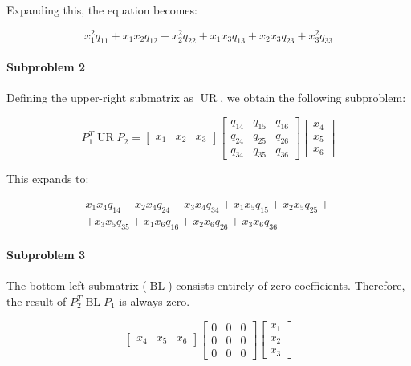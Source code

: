 Expanding this, the equation becomes:

\begin{equation}
 x_1^2q_{11} + x_1x_2q_{12} + x_2^2q_{22} + x_1x_3q_{13} + x_2x_3q_{23} + x_3^2q_{33}
    \label{eq:UL}
\end{equation}

\paragraph{Subproblem 2}
Defining the upper-right submatrix as $\operatorname{UR}$, we obtain the following subproblem:

\begin{equation}
    P_1^T\operatorname{UR}P_2=
    \begin{bmatrix}
        x_1 & x_2 & x_3
    \end{bmatrix}
    \begin{bmatrix}
        q_{14} & q_{15} & q_{16} \\
        q_{24} & q_{25} & q_{26} \\
        q_{34} & q_{35} & q_{36}
    \end{bmatrix}
    \begin{bmatrix}
        x_4 \\
        x_5 \\
        x_6
    \end{bmatrix}
    \label{eq:ur}
\end{equation}

This expands to:

\begin{multline}
    x_1x_4q_{14} + x_2x_4q_{24} + x_3x_4q_{34} + x_1x_5q_{15} + x_2x_5q_{25} + \\ 
    + x_3x_5q_{35} + x_1x_6q_{16} + x_2x_6q_{26} + x_3x_6q_{36} 
    \label{eq:UR}
\end{multline}

\paragraph{Subproblem 3} The bottom-left submatrix ($\operatorname{BL}$) consists entirely of zero coefficients. 
Therefore, the result of $P_2^T\operatorname{BL}P_1$ is always zero.

\begin{equation*}
    \begin{bmatrix}
        x_4 & x_5 & x_6
    \end{bmatrix}
    \begin{bmatrix}
        0 & 0 & 0 \\
        0 & 0 & 0 \\
        0 & 0 & 0
    \end{bmatrix}
    \begin{bmatrix}
        x_1 \\
        x_2 \\
        x_3
    \end{bmatrix}
\end{equation*}

